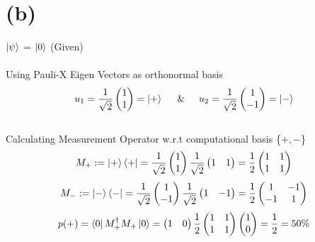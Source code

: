 \documentclass[a4paper, 12pt]{article}
\begin{document}
\section*{\small(b)}
\begin{flushleft}
    $\ket{\psi}$ = $\ket{0}$ (Given)\\~\\
Using Pauli-X Eigen Vectors as orthonormal basis\[u_{1} = \frac{1}{\sqrt{2}}\begin{pmatrix}
    1 \\
    1 \\
\end{pmatrix}=\ket{+}\hspace{5mm} \& \hspace{5mm}u_{2}=\frac{1}{\sqrt{2}}\begin{pmatrix}
    1 \\
    -1 \\
\end{pmatrix}=\ket{-}\] \\
Calculating Measurement Operator w.r.t computational basis \{$+,-$\}
\[M_{+} := \ket{+}\bra{+} =\frac{1}{\sqrt{2}}\begin{pmatrix}
    1 \\
    1 \\
\end{pmatrix} \frac{1}{\sqrt{2}}\begin{pmatrix}
    1 & 1\\
    
\end{pmatrix} = \frac{1}{2}\begin{pmatrix}
    1 & 1\\
    1 & 1\\
\end{pmatrix}\]
\[M_{-} := \ket{-}\bra{-} =\frac{1}{\sqrt{2}}\begin{pmatrix}
    1 \\
    -1 \\
\end{pmatrix} \frac{1}{\sqrt{2}}\begin{pmatrix}
    1 & -1\\
    
\end{pmatrix} = \frac{1}{2}\begin{pmatrix}
    1 & -1\\
    -1 & 1\\
\end{pmatrix}\]
\[p(+)=\bra{0}M_{+}^{\dagger}M_{+}\ket{0} = \begin{pmatrix}
    1 & 0\\
\end{pmatrix} \frac{1}{2} \begin{pmatrix}
    1 & 1 \\
    1 & 1 \\
\end{pmatrix} \begin{pmatrix}
    1 \\
    0 \\
\end{pmatrix} = \frac{1}{2} = 50\%\]


\end{flushleft}
\end{document}
